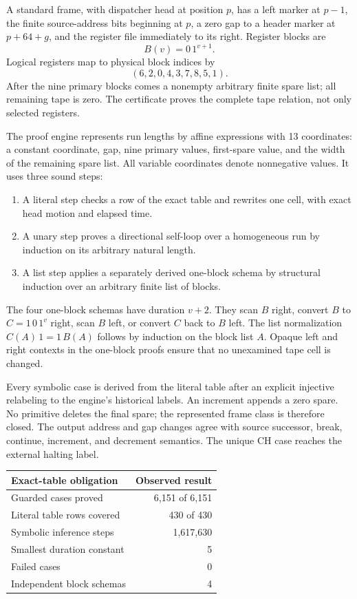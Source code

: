 \documentclass[11pt]{article}
\begin{document}
A standard frame, with dispatcher head at position $p$, has a
left marker at $p-1$, the finite source-address bits beginning at
$p$, a zero gap to a header marker at $p+64+g$, and the register
file immediately to its right. Register blocks are
\[
             B(v)=0\,1^{v+1}.
\]
Logical registers map to physical block indices by
\[
                    (6,2,0,4,3,7,8,5,1).
\]
After the nine primary blocks comes a nonempty arbitrary finite
spare list; all remaining tape is zero. The certificate proves
the complete tape relation, not only selected registers.

The proof engine represents run lengths by affine expressions with
13 coordinates: a constant coordinate, gap, nine primary values,
first-spare value, and the width of the remaining spare list.
All variable coordinates denote nonnegative values.
It uses three sound steps:

\begin{enumerate}
\item A literal step checks a row of the exact table and rewrites one
cell, with exact head motion and elapsed time.
\item A unary step proves a directional self-loop over a homogeneous
run by induction on its arbitrary natural length.
\item A list step applies a separately derived one-block schema by
structural induction over an arbitrary finite list of blocks.
\end{enumerate}

The four one-block schemas have duration $v+2$. They scan $B$
right, convert $B$ to $C=1\,0\,1^v$ right, scan $B$ left, or convert
$C$ back to $B$ left. The list normalization
$C(A)\,1=1\,B(A)$ follows by induction on the block list $A$.
Opaque left and right contexts in the one-block proofs ensure
that no unexamined tape cell is changed.

Every symbolic case is derived from the literal table after an
explicit injective relabeling to the engine's historical labels.
An increment appends a zero spare. No primitive deletes
the final spare; the represented frame class is therefore closed.
The output address and gap changes agree with source successor,
break, continue, increment, and decrement semantics. The unique
CH case reaches the external halting label.

\begin{center}
\begin{tabular}{lr}
\toprule
Exact-table obligation & Observed result\\
\midrule
Guarded cases proved &6,151 of 6,151\\
Literal table rows covered &430 of 430\\
Symbolic inference steps &1,617,630\\
Smallest duration constant &5\\
Failed cases &0\\
Independent block schemas &4\\
\bottomrule
\end{tabular}
\end{center}
\end{document}
